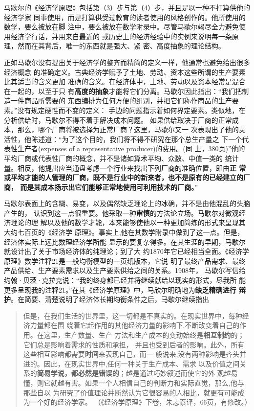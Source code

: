 马歇尔的《经济学原理》包括第（3）步与第（4）步，并且是以一种不打算供他的经济学家
同事使用，而是打算供受过教育的读者使用的风格创作的。他所使用的数学，要么被放在脚
注中，要么被放在数学附录中。尽管马歇尔竭尽全力避免使用经济学行话，并用来自最近的
或历史上的经济经验中的实例来说明每一条原理，然而在其背后，唯一的东西就是强大、紧
密、高度抽象的理论结构。

正如马歇尔没有提出关于经济学的整齐而精简的定义一样，他通常也避免给出很多经济概念
的准确定义。古典经济学赋予了土地、劳动、资本这些所谓的生产要素比其适当的含义更加
准确的含义。在经济体中，土地、劳动以及资本经常是混合在一起的，以至于只
有\textbf{高度的抽象}才能将它们分离。马歇尔因此指出：“我们把制造一件商品所需要的
东西编排为任何方便的组别，并把它们称作商品的生产要素。”没有规定硬性而不变的定义：
手边的问题指示着如何界定要素。类似地，在分析供给时，马歇尔不得不着手解决成本问题。
如果供给取决于厂商的正常成本，那么，哪个厂商将被选择为正常厂商？这里，马歇尔又一
次表现出了他的灵活性，他陈述道：“为了这个目的，我们将不得不研究在那个总生产量之
下一个代表性生产者(expenses of a representative producer)的费用。(同
上，380页)”他的平均厂商或代表性厂商的概念，并不是诸如算术平均、众数、中值一类的
统计量。相反，他提出应当通盘考虑一个行业来找出下列厂商的准确位置，即由\textbf{正
  常或平均才能的人管理的厂商，既不是行业中的新来者，也不是原有的已经建立的厂商，
  而是其成本扬示出它们能够正常地使用可利用技术的厂商。}”

马歇尔表面上的含糊、易变，以及偶然缺乏理论上的冰确，并不是由他混乱的头脑产生的，
认识到这一点很重要。他采取一种\textbf{审慎}的方法论立场。马歇尔对微观经济理论的理
解以及他的数学才能，本来能够使他以一种更加简练的形式来呈现其大约七百页的《经济学
原理》。事实上,他在其数学附录中做到了这一点。但是，经济体实际上远比数理经济学所能
显示的要复杂得多。在其生涯的早期，马歇尔就设计出了关于市场经济体的纯理论；到了大
约1870年它已经相当全面。《经济学原理》数学注释21是一般均衡模型的一页纸版本，它说
明了最终产品需求、最终产品供给、生产要素需求以及生产要素供给之间的关系。1908年，
马歇尔写信给约翰·贝茨·克拉克说：“我的终身都已经并将继续献给以现实的形式，尽我所
能更多呈现我的注释21。”在其《经济学原理》中，马欣尔明确地为\textbf{缺乏精确进行
  辩护}。在简要、清楚说明了经济体长期均衡条件之后，马歇尔继续指出

\begin{quotation}
  但是，在我们生活的世界里，这一切都是不真实的。在现实世界中，每种经济力量都在围
  绕着它起作用的其他经济力量的影响下,不断改变着自己的作用。在这里，生产数量、生产
  方法和生产成本的变动始终是\textbf{相互制约}的；它们总是影响着需求的性质和承担，
  并且也受到后者的影响。此外，所有这些相互影响都需要\textbf{时间}来表现自己，而一
  般说来,没有两种影响是齐头并进的。因此，在现实世界中,任何一种关于生产成本、需求
  以及价值之间关系的\textbf{简易学说，都必然是错误的}；越是通过巧妙叙述而使它的外
  观越易懂，则它就越有害。如果一个人相信自己的判断力和实际直觉，那么,他与那些自以
  为研究了价值理论并断然认为它很容易的人相比，就更有可能成为一个好的经济学家。
  （《经济学原理》下卷，朱志泰译，66页，有修改。）
\end{quotation}

